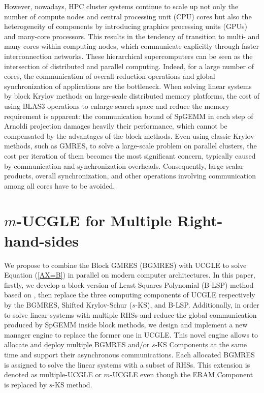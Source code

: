 However, nowadays, HPC cluster systems continue to scale up not only the number of compute nodes and central processing unit (CPU) cores but also the heterogeneity of components by introducing graphics processing units (GPUs) and many-core processors. This results in the tendency of transition to multi- and many cores within computing nodes, which communicate explicitly through faster interconnection networks. These hierarchical supercomputers can be seen as the intersection of distributed and parallel computing. Indeed, for a large number of cores, the communication of overall reduction operations and global synchronization of applications are the bottleneck. When solving linear systems by block Krylov methods on large-scale distributed memory platforms, the cost of using BLAS3 operations to enlarge search space and reduce the memory requirement is apparent: the communication bound of SpGEMM in each step of Arnoldi projection damages heavily their performance, which cannot be compensated by the advantages of the block methods. Even using classic Krylov methods, such as GMRES, to solve a large-scale problem on parallel clusters, the cost per iteration of them becomes the most significant concern, typically caused by communication and synchronization overheads. Consequently, large scalar products, overall synchronization, and other operations involving communication among all cores have to be avoided. 


\section{$m$-UCGLE for Multiple Right-hand-sides}

We propose to combine the Block GMRES (BGMRES) \cite{vital1990etude} with UCGLE \cite{wu2018distributed} to solve Equation (\ref{AX=B}) in parallel on modern computer architectures. In this paper, firstly, we develop a block version of Least Squares Polynomial (B-LSP) method based on \cite{saad1987least}, then replace the three computing components of UCGLE respectively by the BGMRES, Shifted Krylov-Schur ($s$-KS), and B-LSP. Additionally, in order to solve linear systems with multiple RHSs and reduce the global communication produced by SpGEMM inside block methods, we design and implement a new manager engine to replace the former one in UCGLE. This novel engine allows to allocate and deploy multiple BGMRES and/or $s$-KS Components at the same time and support their asynchronous communications. Each allocated BGMRES is assigned to solve the linear systems with a subset of RHSs. This extension is denoted as multiple-UCGLE or $m$-UCGLE even though the ERAM Component is replaced by $s$-KS method. 

